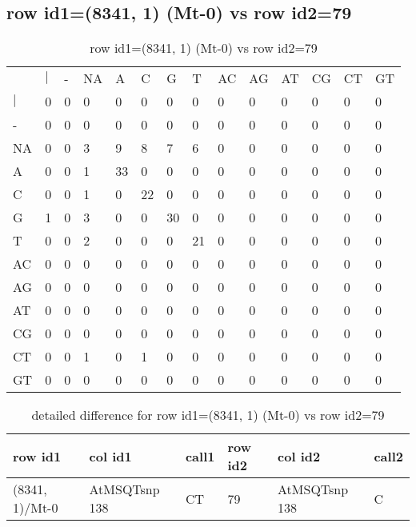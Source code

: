 \subsection{row id1=(8341, 1) (Mt-0) vs row id2=79}
\begin{center}
\begin{longtable}{|l|l|l|l|l|l|l|l|l|l|l|l|l|l|}
\caption{row id1=(8341, 1) (Mt-0) vs row id2=79} \label{table_dm548}\\
\hline
\\
\hline
&$|$&-&NA&A&C&G&T&AC&AG&AT&CG&CT&GT\\
$|$&0&0&0&0&0&0&0&0&0&0&0&0&0\\
-&0&0&0&0&0&0&0&0&0&0&0&0&0\\
NA&0&0&3&9&8&7&6&0&0&0&0&0&0\\
A&0&0&1&33&0&0&0&0&0&0&0&0&0\\
C&0&0&1&0&22&0&0&0&0&0&0&0&0\\
G&1&0&3&0&0&30&0&0&0&0&0&0&0\\
T&0&0&2&0&0&0&21&0&0&0&0&0&0\\
AC&0&0&0&0&0&0&0&0&0&0&0&0&0\\
AG&0&0&0&0&0&0&0&0&0&0&0&0&0\\
AT&0&0&0&0&0&0&0&0&0&0&0&0&0\\
CG&0&0&0&0&0&0&0&0&0&0&0&0&0\\
CT&0&0&1&0&1&0&0&0&0&0&0&0&0\\
GT&0&0&0&0&0&0&0&0&0&0&0&0&0\\
\hline
\end{longtable}
\end{center}

\begin{center}
\begin{longtable}{|l|l|l|l|l|l|}
\caption{detailed difference for row id1=(8341, 1) (Mt-0) vs row id2=79} \label{table_dm549}\\
\hline
row id1&col id1&call1&row id2&col id2&call2\\
\hline
(8341, 1)/Mt-0&AtMSQTsnp 138&CT&79&AtMSQTsnp 138&C\\
\hline
\end{longtable}
\end{center}

